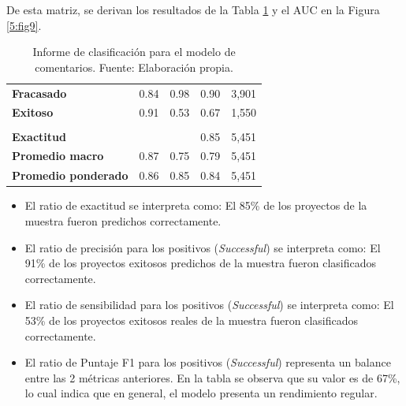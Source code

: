 De esta matriz, se derivan los resultados de la Tabla \ref{5:table3} y el AUC en la Figura \ref{5:fig9}.

\begin{table}[h!]
	\centering
	\small
	\begin{tabular}{ |m{4.5cm}|m{2.5cm}|m{2.5cm}|m{2.5cm}|m{2.5cm}|  }
		\hline
		\rowcolor{bluejean}
		\Centering \color{white}{Valor}& \Centering \color{white}{Precisión}& \Centering \color{white}{Sensibilidad}& \Centering \color{white}{Puntaje F1}& \Centering \color{white}{Muestras}\\
		\hline
		\textbf{Fracasado} & 0.84 & 0.98 & 0.90 & 3,901 \\
		\hline
		\textbf{Exitoso} & 0.91 & 0.53 & 0.67 & 1,550 \\
		\hline
		\rowcolor{turq}
		\multicolumn{5}{c}{ } \\
		\hline
		\textbf{Exactitud} &  &	 & 0.85 & 5,451 \\
		\hline
		\textbf{Promedio macro} & 0.87 & 0.75 & 0.79 & 5,451 \\
		\hline
		\textbf{Promedio ponderado} & 0.86 & 0.85 & 0.84 & 5,451 \\
		\hline
	\end{tabular}
	\caption{Informe de clasificación para el modelo de comentarios. Fuente: Elaboración propia.}
	\label{5:table3}
\end{table}

\begin{itemize}
	\item El ratio de exactitud se interpreta como: El 85\% de los proyectos de la muestra fueron predichos correctamente.
	\item El ratio de precisión para los positivos (\textit{Successful}) se interpreta como: El 91\% de los proyectos exitosos predichos de la muestra fueron clasificados correctamente. 
	\item El ratio de sensibilidad para los positivos (\textit{Successful}) se interpreta como: El 53\% de los proyectos exitosos reales de la muestra fueron clasificados correctamente.
	\item El ratio de Puntaje F1 para los positivos (\textit{Successful}) representa un balance entre las 2 métricas anteriores. En la tabla se observa que su valor es de 67\%, lo cual indica que en general, el modelo presenta un rendimiento regular.
\end{itemize}

